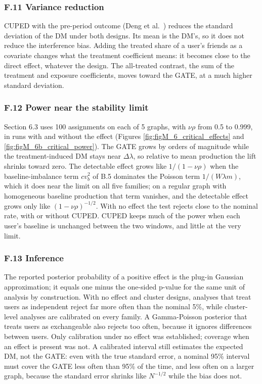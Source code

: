 \documentclass[final,5p,times,twocolumn,number]{elsarticle}
\begin{document}
\subsubsection*{F.11 Variance reduction}

CUPED with the pre-period outcome (Deng et al.~\cite{r7}) reduces the standard deviation of the DM under both designs. Its mean is the DM's, so it does not reduce the interference bias. Adding the treated share of a user's friends as a covariate changes what the treatment coefficient means: it becomes close to the direct effect, whatever the design. The all-treated contrast, the sum of the treatment and exposure coefficients, moves toward the GATE, at a much higher standard deviation.


\subsubsection*{F.12 Power near the stability limit}

Section 6.3 uses 100 assignments on each of 5 graphs, with $\nu\rho$  from 0.5 to 0.999, in runs with and without the effect (Figures \ref{fig:figM_6_critical_effects} and \ref{fig:figM_6b_critical_power}). The GATE grows by orders of magnitude while the treatment-induced DM stays near $\Delta\lambda$, so relative to mean production the lift shrinks toward zero. The detectable effect grows like $1/(1 - \nu\rho)$  when the baseline-imbalance term $cv_b^2$  of B.5 dominates the Poisson term $1/(W\lambda m)$, which it does near the limit on all five families; on a regular graph with homogeneous baseline production that term vanishes, and the detectable effect grows only like $(1 - \nu\rho)^{-1/2}$. With no effect the test rejects close to the nominal rate, with or without CUPED. CUPED keeps much of the power when each user's baseline is unchanged between the two windows, and little at the very limit.


\subsubsection*{F.13 Inference}

The reported posterior probability of a positive effect is the plug-in Gaussian approximation; it equals one minus the one-sided p-value for the same unit of analysis by construction. With no effect and cluster designs, analyses that treat users as independent reject far more often than the nominal 5\%, while cluster-level analyses are calibrated on every family. A Gamma-Poisson posterior that treats users as exchangeable also rejects too often, because it ignores differences between users. Only calibration under no effect was established; coverage when an effect is present was not. A calibrated interval still estimates the expected DM, not the GATE: even with the true standard error, a nominal 95\% interval must cover the GATE less often than 95\% of the time, and less often on a larger graph, because the standard error shrinks like $N^{-1/2}$  while the bias does not.
\end{document}
